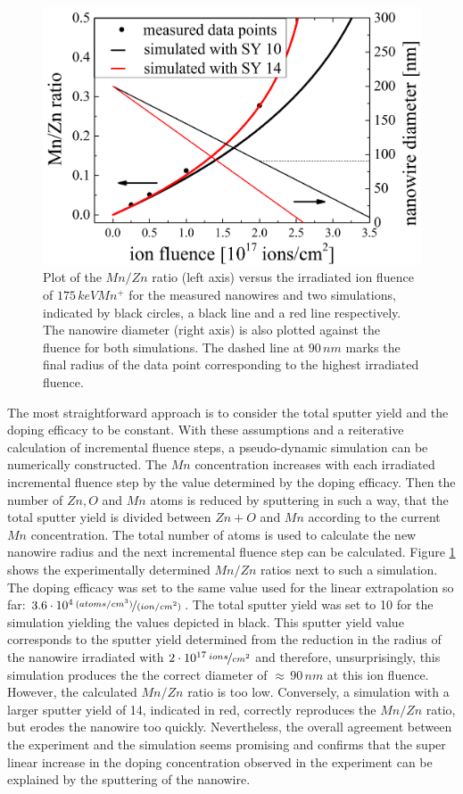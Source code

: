 \begin{figure}
	\centering
		\includegraphics[width=.5\textwidth]{images/staticsputteryield.png}
	\caption{Plot of the $Mn/Zn$ ratio (left axis) versus the irradiated ion fluence of $175\,keV Mn^+$ for the measured nanowires and two simulations, indicated by black circles, a black line and a red line respectively. The nanowire diameter (right axis) is also plotted against the fluence for both simulations. The dashed line at $90\,nm$ marks the final radius of the data point corresponding to the highest irradiated fluence.}
	\label{staticsputter}
\end{figure} 

The most straightforward approach is to consider the total sputter yield and the doping efficacy to be constant. With these assumptions and a reiterative calculation of incremental fluence steps, a pseudo-dynamic simulation can be numerically constructed. The $Mn$ concentration increases with each irradiated incremental fluence step by the value determined by the doping efficacy. Then the number of $Zn, O$ and $Mn$ atoms is reduced by sputtering in such a way, that the total sputter yield is divided between $Zn+O$ and $Mn$ according to the current $Mn$ concentration. The total number of atoms is used to calculate the new nanowire radius and the next incremental fluence step can be calculated. Figure \ref{staticsputter} shows the experimentally determined $Mn/Zn$ ratios next to such a simulation. The doping efficacy was set to the same value used for the linear extrapolation so far: $3.6\cdot10^4\,\nicefrac{(atoms/cm^3)}{(ion/cm^2)}$. The total sputter yield was set to 10 for the simulation yielding the values depicted in black. This sputter yield value corresponds to the sputter yield determined from the reduction in the radius of the nanowire irradiated with $2\cdot10^{17}\,\nicefrac{ions}{cm^2}$ and therefore, unsurprisingly, this simulation produces the the correct diameter of $\approx\,90\,nm$ at this ion fluence. However, the calculated $Mn/Zn$ ratio is too low. Conversely, a simulation with a larger sputter yield of 14, indicated in red, correctly reproduces the $Mn/Zn$ ratio, but erodes the nanowire too quickly. Nevertheless, the overall agreement between the experiment and the simulation seems promising and confirms that the super linear increase in the doping concentration observed in the experiment can be explained by the sputtering of the nanowire.

